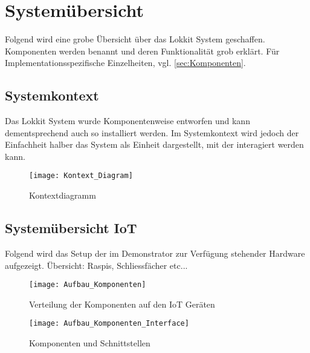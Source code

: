\section{Systemübersicht}
Folgend wird eine grobe Übersicht über das Lokkit System geschaffen. Komponenten werden benannt und deren Funktionalität grob erklärt. Für Implementationsspezifische Einzelheiten, vgl. \ref{sec:Komponenten}.

\subsection{Systemkontext}
Das Lokkit System wurde Komponentenweise entworfen und kann dementsprechend auch so installiert werden. Im Systemkontext wird jedoch der Einfachheit halber das System als Einheit dargestellt, mit der interagiert werden kann.
\begin{figure}[H]
\centering
\texttt{[image: Kontext\_Diagram]}
\caption{Kontextdiagramm}
\label{fig:Kontextdiagramm}
\end{figure}

\subsection{Systemübersicht IoT}
\label{subsec:Setup_IoT}
Folgend wird das Setup der im Demonstrator zur Verfügung stehender Hardware aufgezeigt.
Übersicht: Raspis, Schliessfächer etc...

\begin{figure}[H]
\centering
\texttt{[image: Aufbau\_Komponenten]}
\caption{Verteilung der Komponenten auf den IoT Geräten}
\label{fig:Aufbau Komponenten}
\end{figure}

\begin{figure}[H]
\centering
\texttt{[image: Aufbau\_Komponenten\_Interface]}
\caption{Komponenten und Schnittstellen}
\label{fig:Komponenten und Schnittstellen}
\end{figure}
